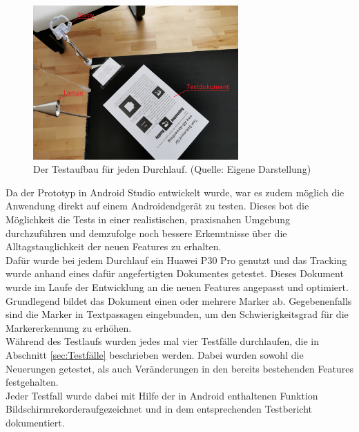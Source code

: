 \begin{figure}[h!]
\centering
\includegraphics[width=0.7\textwidth]{Abbildungen/Testaufbau.jpeg}
\caption[Testaufbau]{Der Testaufbau für jeden Durchlauf. (Quelle: Eigene Darstellung)}
\label{fig:Testaufbau}
\end{figure}

Da der Prototyp in Android Studio entwickelt wurde, war es zudem möglich die Anwendung direkt auf einem Androidendgerät zu testen. Dieses bot die Möglichkeit die Tests in einer realistischen, praxisnahen Umgebung durchzuführen und demzufolge noch bessere Erkenntnisse über die Alltagstauglichkeit der neuen Features zu erhalten.  \\
Dafür wurde bei jedem Durchlauf ein Huawei P30 Pro genutzt und das Tracking wurde anhand eines dafür angefertigten Dokumentes  getestet. Dieses Dokument wurde im Laufe der Entwicklung an die neuen Features angepasst und optimiert. Grundlegend bildet das Dokument einen oder mehrere Marker ab. Gegebenenfalls sind die Marker in Textpassagen eingebunden, um den Schwierigkeitsgrad für die Markererkennung zu erhöhen.\\
Während des Testlaufs wurden jedes mal vier Testfälle durchlaufen, die in Abschnitt \ref{sec:Testfälle} beschrieben werden. Dabei wurden sowohl die Neuerungen getestet, als auch Veränderungen in den bereits bestehenden Features festgehalten.\\
Jeder Testfall wurde dabei mit Hilfe der in Android enthaltenen Funktion \glqq Bildschirmrekorder\grqq aufgezeichnet und in dem entsprechenden Testbericht dokumentiert.


